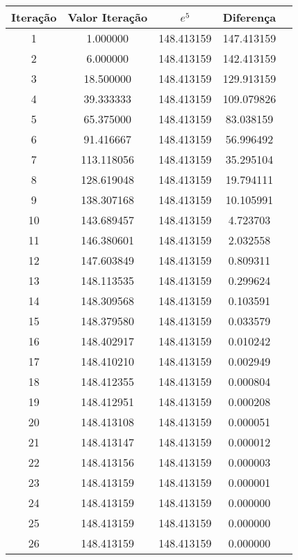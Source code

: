 \begin{table}[H]
	\centering
	\begin{tabular}{|c|c|c|c|c|}
    	\hline
		Iteração & Valor Iteração & $e^5$ & Diferença \\
		\hline
		1 & 1.000000 & 148.413159 & 147.413159\\
		\hline
		2 & 6.000000 & 148.413159 & 142.413159\\
		\hline
		3 & 18.500000 & 148.413159 & 129.913159\\
		\hline
		4 & 39.333333 & 148.413159 & 109.079826\\
		\hline
		5 & 65.375000 & 148.413159 & 83.038159\\
		\hline
		6 & 91.416667 & 148.413159 & 56.996492\\
		\hline
		7 & 113.118056 & 148.413159 & 35.295104\\
		\hline
		8 & 128.619048 & 148.413159 & 19.794111\\
		\hline
		9 & 138.307168 & 148.413159 & 10.105991\\
		\hline
		10 & 143.689457 & 148.413159 & 4.723703\\
		\hline
		11 & 146.380601 & 148.413159 & 2.032558\\
		\hline
		12 & 147.603849 & 148.413159 & 0.809311\\
		\hline
		13 & 148.113535 & 148.413159 & 0.299624\\
		\hline
		14 & 148.309568 & 148.413159 & 0.103591\\
		\hline
		15 & 148.379580 & 148.413159 & 0.033579\\
		\hline
		16 & 148.402917 & 148.413159 & 0.010242\\
		\hline
		17 & 148.410210 & 148.413159 & 0.002949\\
		\hline
		18 & 148.412355 & 148.413159 & 0.000804\\
		\hline
		19 & 148.412951 & 148.413159 & 0.000208\\
		\hline
		20 & 148.413108 & 148.413159 & 0.000051\\
		\hline
		21 & 148.413147 & 148.413159 & 0.000012\\
		\hline
		22 & 148.413156 & 148.413159 & 0.000003\\
		\hline
		23 & 148.413159 & 148.413159 & 0.000001\\
		\hline
		24 & 148.413159 & 148.413159 & 0.000000\\
		\hline
		25 & 148.413159 & 148.413159 & 0.000000\\
		\hline
		26 & 148.413159 & 148.413159 & 0.000000\\

\end{tabular}
\end{table}
